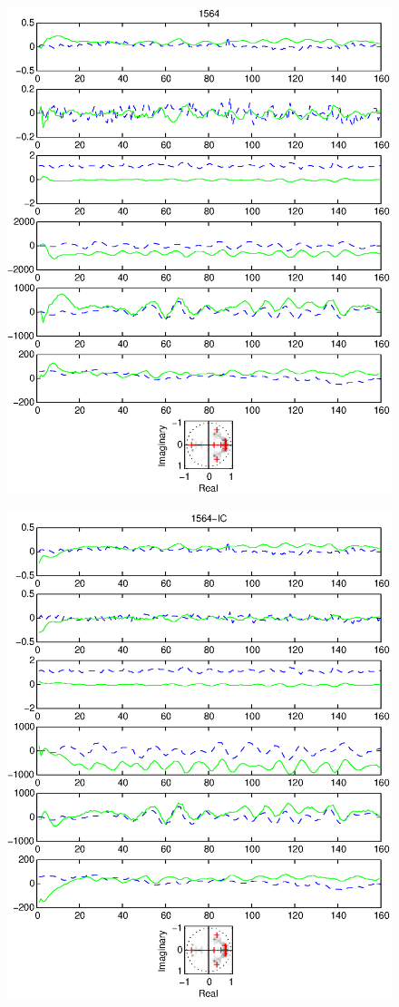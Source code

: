 \documentclass{article}
\begin{document}
\begin{figure}[htb!]
\centering
\includegraphics{1564.eps}
\end{figure}\clearpage
\begin{figure}[htb!]
\centering
\includegraphics{1564_ic.eps}
\end{figure}\clearpage
\end{document}
